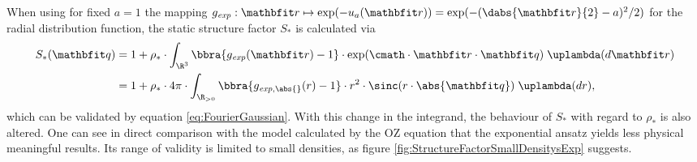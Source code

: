 When using for fixed $a = 1$ the mapping $g_{\mathit{exp}}:\vr\mapsto \exp(-u_a(\vr)) = \exp(-(\dabs{\vr}{2} - a)^2/2)$ for the radial distribution function, the static structure factor $S_*$ is calculated via
\begin{align*}
    S_*(\vq) &= 1 + \rho_*\cdot\int_{\R^3}\bbra{g_{\mathit{exp}}(\vr) - 1}\cdot\exp(\cmath\cdot \vr\cdot \vq)\;\uplambda(d\vr) \\
    &= 1 + \rho_*\cdot 4\pi\cdot\int_{\R_{>0}}\bbra{g_{\mathit{exp},\abs{}}(r) - 1}\cdot r^2\cdot\sinc(r\cdot \abs{\vq})\;\uplambda(dr),
\end{align*}
which can be validated by equation \eqref{eq:FourierGaussian}.
With this change in the integrand, the behaviour of $S_*$ with regard to $\rho_*$ is also altered. One can see in direct comparison with the model calculated by the OZ equation that the exponential ansatz yields less physical meaningful results. Its range of validity is limited to small densities, as figure \ref{fig:StructureFactorSmallDensitysExp} suggests.

